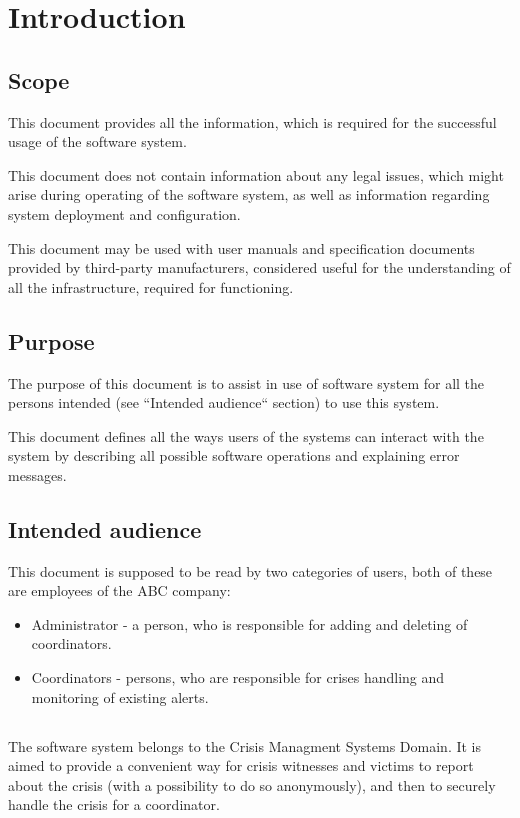 \chapter{Introduction}
\label{chap:introduction}

\section{Scope}
This document provides all the information, which is required for the successful
usage of the \mysystemname software system.

This document does not contain information about any legal issues, which might
arise during operating of the \mysystemname software system, as well as
information regarding system deployment and configuration.
 
This document may be used with user manuals and specification documents provided
by third-party manufacturers, considered useful for the understanding of all the
infrastructure, required for \mysystemname functioning.

\section{Purpose}
The purpose of this document is to assist in use of \mysystemname software
system for all the persons intended (see ``Intended audience`` section) to use
this system.

This document defines all the ways users of the systems can interact with the
system by describing all possible software operations and explaining error
messages.

\section{Intended audience}
This document is supposed to be read by two categories of \mysystemname users,
both of these are employees of the ABC company:
\begin{itemize}
  \item Administrator - a person, who is responsible for adding and deleting of
  coordinators.
  \item Coordinators -  persons, who are responsible for crises handling and
  monitoring of existing alerts.
\end{itemize}


\section{\mysystemname}
The \mysystemname software system belongs to the Crisis Managment Systems
Domain. It is aimed to provide a convenient  way for crisis witnesses  and
victims to report about the crisis (with a possibility to do so anonymously),
and then to securely handle the crisis for a coordinator.

